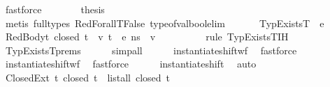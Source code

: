 \begin{isabellebody}
\ fastforce\isanewline
\ \ \ \ \isamarkupfalse%
\ \isamarkupfalse%
\ {\isacharquery}{\kern0pt}thesis\isanewline
\ \ \ \ \ \ \isamarkupfalse%
\ {\isacharparenleft}{\kern0pt}metis\ {\isacharparenleft}{\kern0pt}full{\isacharunderscore}{\kern0pt}types{\isacharparenright}{\kern0pt}\ RedForallT{\isacharunderscore}{\kern0pt}False\ type{\isacharunderscore}{\kern0pt}of{\isacharunderscore}{\kern0pt}val{\isacharunderscore}{\kern0pt}bool{\isacharunderscore}{\kern0pt}elim{\isacharparenright}{\kern0pt}\isanewline
\ \ \isamarkupfalse%
\isanewline
{}\isamarkupfalse%
\isanewline
\ \ \isamarkupfalse%
\ {\isacharparenleft}{\kern0pt}TypExistsT\ {\isasymDelta}\ e{\isacharparenright}{\kern0pt}\isanewline
\ \ \isanewline
\isanewline
\ \ \isamarkupfalse%
\ RedBody{\isacharcolon}{\kern0pt}{\isachardoublequoteopen}{\isasymAnd}t{\isachardot}{\kern0pt}\ closed\ t\ {\isasymLongrightarrow}\ {\isacharparenleft}{\kern0pt}{\isasymexists}v{\isachardot}{\kern0pt}\ {\isasymLambda}{\isacharcomma}{\kern0pt}{\isasymGamma}{\isacharcomma}{\kern0pt}t{\isacharhash}{\kern0pt}{\isasymOmega}\ {\isasymturnstile}\ {\isasymlangle}e{\isacharcomma}{\kern0pt}\ n{\isacharunderscore}{\kern0pt}s{\isasymrangle}\ {\isasymDown}\ v{\isacharparenright}{\kern0pt}{\isachardoublequoteclose}\ \ \ \ \isanewline
\ \ \ \ \isamarkupfalse%
\ {\isacharparenleft}{\kern0pt}rule\ TypExistsT{\isachardot}{\kern0pt}IH{\isacharparenright}{\kern0pt}\isanewline
\ \ \ \ \isamarkupfalse%
\ TypExistsT{\isachardot}{\kern0pt}prems\isanewline
\ \ \ \ \isamarkupfalse%
\ simp{\isacharunderscore}{\kern0pt}all\isanewline
\ \ \ \ \isamarkupfalse%
\ instantiate{\isacharunderscore}{\kern0pt}shift{\isacharunderscore}{\kern0pt}wf\ \isamarkupfalse%
\ fastforce\isanewline
\ \ \ \ \isamarkupfalse%
\ instantiate{\isacharunderscore}{\kern0pt}shift{\isacharunderscore}{\kern0pt}wf\ \isamarkupfalse%
\ fastforce\isanewline
\ \ \ \ \isamarkupfalse%
\ instantiate{\isacharunderscore}{\kern0pt}shift\ \isamarkupfalse%
\ auto\isanewline
\isanewline
\ \ \isamarkupfalse%
\ Closed{\isasymOmega}Ext{\isacharcolon}{\kern0pt}\ {\isachardoublequoteopen}{\isasymAnd}t{\isachardot}{\kern0pt}\ closed\ t\ {\isasymLongrightarrow}\ list{\isacharunderscore}{\kern0pt}all\ closed\ {\isacharparenleft}{\kern0pt}t{\isacharhash}{\kern0pt}{\isasymOmega}{\isacharparenright}{\kern0pt}{\isachardoublequoteclose}\isanewline

\end{isabellebody}
